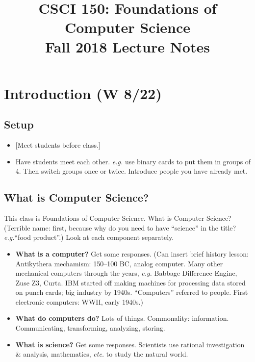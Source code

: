 \documentclass{article}
\newcommand{\etc}{\emph{etc.}\xspace}
\newcommand{\eg}{\emph{e.g.}\xspace}
\begin{document}
\title{CSCI 150: Foundations of Computer Science \\ Fall 2018 Lecture
  Notes}

\maketitle

\section{Introduction (W 8/22)}

\subsection*{Setup}

\begin{itemize}
\item {}[Meet students before class.]
\item Have students meet each other. \eg use binary cards to
  put them in groups of 4.  Then switch groups once or twice.
  Introduce people you have already met.
\end{itemize}

\subsection*{What is Computer Science?}

This class is Foundations of Computer Science.  What is Computer
Science?  (Terrible name: first, because why do you need to have
``science'' in the title?  \eg ``food product''.)  Look at each
component separately.
\begin{itemize}
\item \textbf{What is a computer?}  Get some responses.  (Can insert
  brief history lesson: Antikythera mechamism: 150--100 BC, analog
  computer.  Many other mechanical computers through the years,
  \eg Babbage Difference Engine, Zuse Z3, Curta.  IBM started off
  making machines for processing data stored on punch cards; big
  industry by 1940s. ``Computers'' referred to people.  First
  electronic computers: WWII, early 1940s.)
\item \textbf{What do computers do?}  Lots of things.  Commonality:
  information.  Communicating, transforming, analyzing, storing.
\item \textbf{What is science?}  Get some responses.  Scientists use
  rational investigation \& analysis, mathematics, \etc to study the
  natural world.
\end{itemize}
\end{document}
